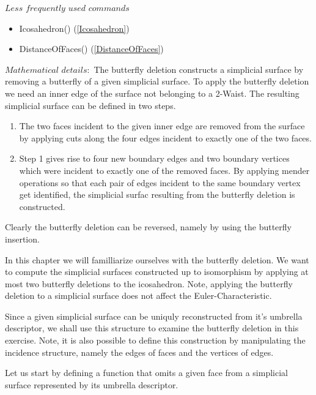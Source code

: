\documentclass[a4paper,11pt]{report}
\begin{document}
{{ $Less$ $frequently$ $used$ $commands$ 
\begin{itemize}
\item  Icosahedron() (\ref{Icosahedron}) 
\item  DistanceOfFaces() (\ref{DistanceOfFaces}) 
\end{itemize}
 $ Mathematical$ $details:$ The butterfly deletion constructs a simplicial surface by removing a butterfly
of a given simplicial surface. To apply the butterfly deletion we need an
inner edge of the surface not belonging to a 2-Waist. The resulting simplicial
surface can be defined in two steps. 
\begin{enumerate}
\item  The two faces incident to the given inner edge are removed from the surface by
applying cuts along the four edges incident to exactly one of the two faces. 
\item  Step 1 gives rise to four new boundary edges and two boundary vertices which
were incident to exactly one of the removed faces. By applying mender
operations so that each pair of edges incident to the same boundary vertex get
identified, the simplicial surfac resulting from the butterfly deletion is
constructed. 
\end{enumerate}
 Clearly the butterfly deletion can be reversed, namely by using the butterfly
insertion. 

 
\begin{center}

\end{center}
 

 In this chapter we will familliarize ourselves with the butterfly deletion. We
want to compute the simplicial surfaces constructed up to isomorphism by
applying at most two butterfly deletions to the icosahedron. Note, applying
the butterfly deletion to a simplicial surface does not affect the
Euler-Characteristic. 

 
 

 Since a given simplicial surface can be uniquly reconstructed from it's
umbrella descriptor, we shall use this structure to examine the butterfly
deletion in this exercise. Note, it is also possible to define this
construction by manipulating the incidence structure, namely the edges of
faces and the vertices of edges. 

 Let us start by defining a function that omits a given face from a simplicial
surface represented by its umbrella descriptor. 

}}
\end{document}
